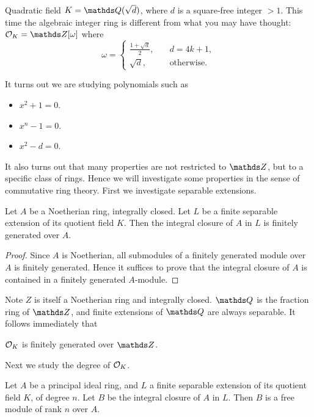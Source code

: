 		\begin{example}
			Quadratic field $K=\Q(\sqrt{d})$, where $d$ is a square-free integer $>1$. This time the algebraic integer ring is different from what you may have thought: $\OK = \Z[\omega]$ where
				\[
					\omega = \begin{cases}
						\frac{1+\sqrt{d}}{2}, &\quad d = 4k+1, \\
						\sqrt{d}, &\quad \text{otherwise}.
					\end{cases}
				\]
		\end{example}
		It turns out we are studying polynomials such as
		\begin{itemize}
			\item $x^2+1=0$.
			\item $x^n-1=0$.
			\item $x^2-d=0$.
		\end{itemize}
		It also turns out that many properties are not restricted to $\Z$, but to a specific class of rings. Hence we will investigate some properties in the sense of commutative ring theory. First we investigate separable extensions.
		
		\begin{theorem}
			Let $A$ be a Noetherian ring, integrally closed. Let $L$ be a finite separable extension of its quotient field $K$. Then the integral closure of $A$ in $L$ is finitely generated over $A$.
		\end{theorem}
		\begin{proof}
			Since $A$ is Noetherian, all submodules of a finitely generated module over $A$ is finitely generated. Hence it suffices to prove that the integral closure of $A$ is contained in a finitely generated $A$-module. %
		\end{proof}
		Note $Z$ is itself a Noetherian ring and integrally closed. $\Q$ is the fraction ring of $\Z$, and finite extensions of $\Q$ are always separable. It follows immediately that
		\begin{corollary}
			$\mathcal{O}_K$ is finitely generated over $\Z$.
		\end{corollary}
	
		Next we study the degree of $\mathcal{O}_K$.
		
		\begin{theorem}
			Let $A$ be a principal ideal ring, and $L$ a finite separable extension of its quotient field $K$, of degree $n$. Let $B$ be the integral closure of $A$ in $L$. Then $B$ is a free module of rank $n$ over $A$. 
		\end{theorem}
	
